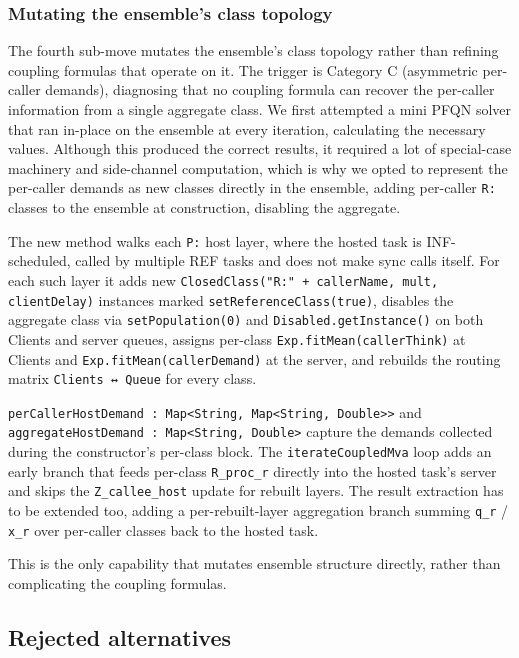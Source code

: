 \subsubsection*{Mutating the ensemble's class topology}

The fourth sub-move mutates the ensemble's class topology rather than refining coupling formulas that operate on it. The trigger is Category C (asymmetric per-caller demands), diagnosing that no coupling formula can recover the per-caller information from a single aggregate class. We first attempted a mini PFQN solver that ran in-place on the ensemble at every iteration, calculating the necessary values. Although this produced the correct results, it required a lot of special-case machinery and side-channel computation, which is why we opted to represent the per-caller demands as new classes directly in the ensemble, adding per-caller \texttt{R:} classes to the ensemble at construction, disabling the aggregate. 

The new method walks each \texttt{P:} host layer, where the hosted task is INF-scheduled, called by multiple REF tasks and does not make sync calls itself. For each such layer it adds new \texttt{ClosedClass("R:" + callerName, mult, clientDelay)} instances marked \texttt{setReferenceClass(true)}, disables the aggregate class via \texttt{setPopulation(0)} and \texttt{Disabled.getInstance()} on both Clients and server queues, assigns per-class \texttt{Exp.fitMean(callerThink)} at Clients and \texttt{Exp.fitMean(callerDemand)} at the server, and rebuilds the routing matrix \texttt{Clients ↔ Queue} for every class.

\texttt{perCallerHostDemand : Map<String, Map<String, Double>>} and \texttt{aggregateHostDemand : Map<String, Double>} capture the demands collected during the constructor's per-class block. The \texttt{iterateCoupledMva} loop adds an early branch that feeds per-class \texttt{R\_proc\_r} directly into the hosted task's server and skips the \texttt{Z\_callee\_host} update for rebuilt layers. The result extraction has to be extended too, adding a per-rebuilt-layer aggregation branch summing \texttt{q\_r} / \texttt{x\_r} over per-caller classes back to the hosted task.

This is the only capability that mutates ensemble structure directly, rather than complicating the coupling formulas.

\subsection{Rejected alternatives}


